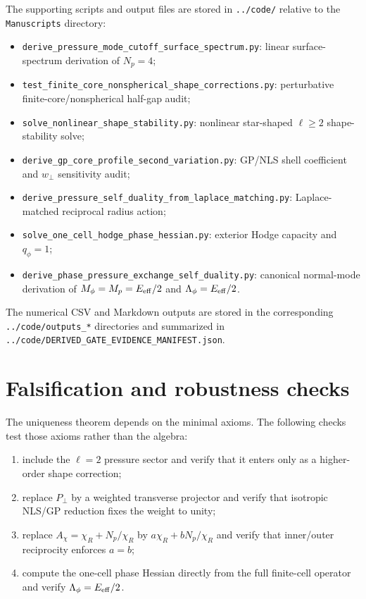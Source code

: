 \documentclass[11pt]{article}
\newcommand{\Eeff}{E_{\rm eff}}
\begin{document}
The supporting scripts and output files are stored in \texttt{../code/} relative
to the \texttt{Manuscripts} directory:
\begin{itemize}
\item \texttt{derive\_pressure\_mode\_cutoff\_surface\_spectrum.py}:
linear surface-spectrum derivation of \(N_p=4\);
\item \texttt{test\_finite\_core\_nonspherical\_shape\_corrections.py}:
perturbative finite-core/nonspherical half-gap audit;
\item \texttt{solve\_nonlinear\_shape\_stability.py}:
nonlinear star-shaped \(\ell\ge2\) shape-stability solve;
\item \texttt{derive\_gp\_core\_profile\_second\_variation.py}:
GP/NLS shell coefficient and \(w_\perp\) sensitivity audit;
\item \texttt{derive\_pressure\_self\_duality\_from\_laplace\_matching.py}:
Laplace-matched reciprocal radius action;
\item \texttt{solve\_one\_cell\_hodge\_phase\_hessian.py}:
exterior Hodge capacity and \(q_\phi=1\);
\item \texttt{derive\_phase\_pressure\_exchange\_self\_duality.py}:
canonical normal-mode derivation of \(M_\phi=M_p=E_{\rm eff}/2\) and
\(\Lambda_\phi=E_{\rm eff}/2\).
\end{itemize}
The numerical CSV and Markdown outputs are stored in the corresponding
\texttt{../code/outputs\_*} directories and summarized in
\texttt{../code/DERIVED\_GATE\_EVIDENCE\_MANIFEST.json}.

\section{Falsification and robustness checks}

The uniqueness theorem depends on the minimal axioms.  The following checks
test those axioms rather than the algebra:
\begin{enumerate}
\item include the \(\ell=2\) pressure sector and verify that it enters only as a
higher-order shape correction;
\item replace \(P_\perp\) by a weighted transverse projector and verify that
isotropic NLS/GP reduction fixes the weight to unity;
\item replace \(A_\chi=\chi_R+N_p/\chi_R\) by
\(a\chi_R+bN_p/\chi_R\) and verify that inner/outer reciprocity enforces
\(a=b\);
\item compute the one-cell phase Hessian directly from the full finite-cell
operator and verify \(\Lambda_\phi=\Eeff/2\).
\end{enumerate}
\end{document}
